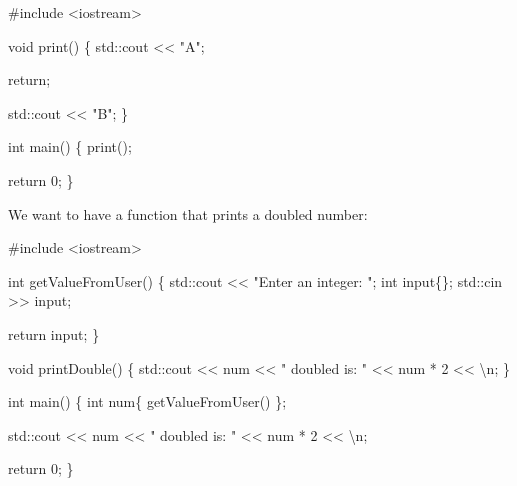\documentclass[
  letterpaper,
  DIV=11,
  numbers=noendperiod]{scrreprt}
\newenvironment{Shaded}{\begin{snugshade}}{\end{snugshade}}
\newcommand{\CommentTok}[1]{\textcolor[rgb]{0.37,0.37,0.37}{#1}}
\newcommand{\DecValTok}[1]{\textcolor[rgb]{0.68,0.00,0.00}{#1}}
\newcommand{\ErrorTok}[1]{\textcolor[rgb]{0.68,0.00,0.00}{#1}}
\newcommand{\FunctionTok}[1]{\textcolor[rgb]{0.28,0.35,0.67}{#1}}
\newcommand{\NormalTok}[1]{\textcolor[rgb]{0.00,0.23,0.31}{#1}}
\newcommand{\SpecialCharTok}[1]{\textcolor[rgb]{0.37,0.37,0.37}{#1}}
\newcommand{\StringTok}[1]{\textcolor[rgb]{0.13,0.47,0.30}{#1}}
\begin{document}
\begin{Shaded}
\begin{Highlighting}[]
\CommentTok{\#include \textless{}iostream\textgreater{}}

\NormalTok{void }\FunctionTok{print}\NormalTok{()}
\NormalTok{\{}
\NormalTok{    std}\SpecialCharTok{::}\NormalTok{cout }\SpecialCharTok{\textless{}}\ErrorTok{\textless{}} \StringTok{"A"}\NormalTok{;}

\NormalTok{    return;}

\NormalTok{    std}\SpecialCharTok{::}\NormalTok{cout }\SpecialCharTok{\textless{}}\ErrorTok{\textless{}} \StringTok{"B"}\NormalTok{;}
\NormalTok{\}}

\NormalTok{int }\FunctionTok{main}\NormalTok{()}
\NormalTok{\{}
    \FunctionTok{print}\NormalTok{();}

\NormalTok{    return }\DecValTok{0}\NormalTok{;}
\NormalTok{\}}
\end{Highlighting}
\end{Shaded}

We want to have a function that prints a doubled number:

\begin{Shaded}
\begin{Highlighting}[]
\CommentTok{\#include \textless{}iostream\textgreater{}}

\NormalTok{int }\FunctionTok{getValueFromUser}\NormalTok{()}
\NormalTok{\{}
\NormalTok{    std}\SpecialCharTok{::}\NormalTok{cout }\SpecialCharTok{\textless{}}\ErrorTok{\textless{}} \StringTok{"Enter an integer: "}\NormalTok{;}
\NormalTok{    int input\{\};}
\NormalTok{    std}\SpecialCharTok{::}\NormalTok{cin }\SpecialCharTok{\textgreater{}}\ErrorTok{\textgreater{}}\NormalTok{ input;}

\NormalTok{    return input;}
\NormalTok{\}}

\NormalTok{void }\FunctionTok{printDouble}\NormalTok{()}
\NormalTok{\{}
\NormalTok{    std}\SpecialCharTok{::}\NormalTok{cout }\SpecialCharTok{\textless{}}\ErrorTok{\textless{}}\NormalTok{ num }\SpecialCharTok{\textless{}}\ErrorTok{\textless{}} \StringTok{" doubled is: "} \SpecialCharTok{\textless{}}\ErrorTok{\textless{}}\NormalTok{ num }\SpecialCharTok{*} \DecValTok{2} \SpecialCharTok{\textless{}}\ErrorTok{\textless{}} \StringTok{\textquotesingle{}}\SpecialCharTok{\textbackslash{}n}\StringTok{\textquotesingle{}}\NormalTok{;}
\NormalTok{\}}

\NormalTok{int }\FunctionTok{main}\NormalTok{()}
\NormalTok{\{}
\NormalTok{    int num\{ }\FunctionTok{getValueFromUser}\NormalTok{() \};}

\NormalTok{    std}\SpecialCharTok{::}\NormalTok{cout }\SpecialCharTok{\textless{}}\ErrorTok{\textless{}}\NormalTok{ num }\SpecialCharTok{\textless{}}\ErrorTok{\textless{}} \StringTok{" doubled is: "} \SpecialCharTok{\textless{}}\ErrorTok{\textless{}}\NormalTok{ num }\SpecialCharTok{*} \DecValTok{2} \SpecialCharTok{\textless{}}\ErrorTok{\textless{}} \StringTok{\textquotesingle{}}\SpecialCharTok{\textbackslash{}n}\StringTok{\textquotesingle{}}\NormalTok{;}

\NormalTok{    return }\DecValTok{0}\NormalTok{;}
\NormalTok{\}}
\end{Highlighting}
\end{Shaded}
\end{document}
